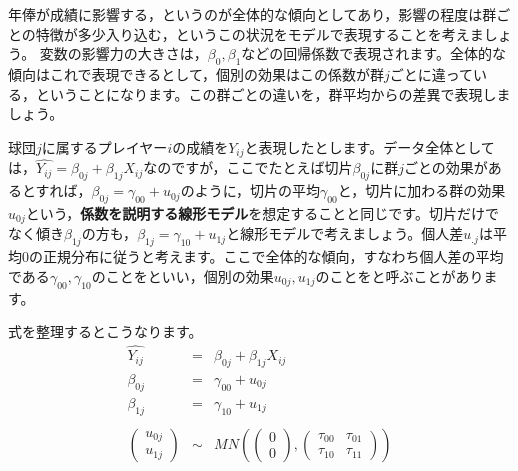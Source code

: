 \documentclass{ltjsbook}
\begin{document}
年俸が成績に影響する，というのが全体的な傾向としてあり，影響の程度は群ごとの特徴が多少入り込む，というこの状況をモデルで表現することを考えましょう。
変数の影響力の大きさは，$\beta_0,\beta_1$などの回帰係数で表現されます。全体的な傾向はこれで表現できるとして，個別の効果はこの係数が群$j$ごとに違っている，ということになります。この群ごとの違いを，群平均からの差異で表現しましょう。

球団$j$に属するプレイヤー$i$の成績を$Y_{ij}$と表現したとします。データ全体としては，$\hat{Y_{ij}} = \beta_{0j} + \beta_{1j} X_{ij}$なのですが，ここでたとえば切片$\beta_{0j}$に群$j$ごとの効果があるとすれば，$\beta_{0j} = \gamma_{00} + u_{0j}$のように，切片の平均$\gamma_{00}$と，切片に加わる群の効果$u_{0j}$という，\textbf{係数を説明する線形モデル}を想定することと同じです。切片だけでなく傾き$\beta_{1j}$の方も，$\beta_{1j} = \gamma_{10} + u_{1j}$と線形モデルで考えましょう。個人差$u_{.j}$は平均$0$の正規分布に従うと考えます。ここで全体的な傾向，すなわち個人差の平均である$\gamma_{00},\gamma_{10}$のことをといい，個別の効果$u_{0j},u_{1j}$のことをと呼ぶことがあります。

式を整理するとこうなります。
\begin{equation}
	\begin{array}{lll}
		\hat{Y_{ij}}                                   & =    & \beta_{0j} + \beta_{1j} X_{ij}                                                                                                    \\
		\beta_{0j}                                     & =    & \gamma_{00} + u_{0j}                                                                                                              \\
		\beta_{1j}                                     & =    & \gamma_{10} + u_{1j}                                                                                                              \\ &&\\
		\begin{pmatrix} u_{0j} \\ u_{1j} \end{pmatrix} & \sim & MN \left( \begin{pmatrix} 0\\0\end{pmatrix},\begin{pmatrix} \tau_{00} & \tau_{01} \\ \tau_{10} & \tau_{11} \end{pmatrix} \right )
	\end{array}
\end{equation}
\end{document}
